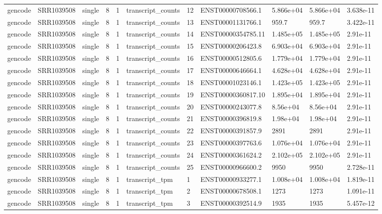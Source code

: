\begin{tabular}{lllllllllll}
gencode & SRR1039508 & single & 8 & 1 & transcript\_counts & 12 & ENST00000708566.1 & 5.866e+04 & 5.866e+04 & 3.638e-11 \\
gencode & SRR1039508 & single & 8 & 1 & transcript\_counts & 13 & ENST00001131766.1 & 959.7 & 959.7 & 3.422e-11 \\
gencode & SRR1039508 & single & 8 & 1 & transcript\_counts & 14 & ENST00000354785.11 & 1.485e+05 & 1.485e+05 & 2.91e-11 \\
gencode & SRR1039508 & single & 8 & 1 & transcript\_counts & 15 & ENST00000206423.8 & 6.903e+04 & 6.903e+04 & 2.91e-11 \\
gencode & SRR1039508 & single & 8 & 1 & transcript\_counts & 16 & ENST00000512805.6 & 1.779e+04 & 1.779e+04 & 2.91e-11 \\
gencode & SRR1039508 & single & 8 & 1 & transcript\_counts & 17 & ENST00000646664.1 & 4.628e+04 & 4.628e+04 & 2.91e-11 \\
gencode & SRR1039508 & single & 8 & 1 & transcript\_counts & 18 & ENST00001023146.1 & 1.423e+05 & 1.423e+05 & 2.91e-11 \\
gencode & SRR1039508 & single & 8 & 1 & transcript\_counts & 19 & ENST00000360817.10 & 1.895e+04 & 1.895e+04 & 2.91e-11 \\
gencode & SRR1039508 & single & 8 & 1 & transcript\_counts & 20 & ENST00000243077.8 & 8.56e+04 & 8.56e+04 & 2.91e-11 \\
gencode & SRR1039508 & single & 8 & 1 & transcript\_counts & 21 & ENST00000396819.8 & 1.98e+04 & 1.98e+04 & 2.91e-11 \\
gencode & SRR1039508 & single & 8 & 1 & transcript\_counts & 22 & ENST00000391857.9 & 2891 & 2891 & 2.91e-11 \\
gencode & SRR1039508 & single & 8 & 1 & transcript\_counts & 23 & ENST00000397763.6 & 1.076e+04 & 1.076e+04 & 2.91e-11 \\
gencode & SRR1039508 & single & 8 & 1 & transcript\_counts & 24 & ENST00000361624.2 & 2.102e+05 & 2.102e+05 & 2.91e-11 \\
gencode & SRR1039508 & single & 8 & 1 & transcript\_counts & 25 & ENST00000966600.2 & 9950 & 9950 & 2.728e-11 \\
gencode & SRR1039508 & single & 8 & 1 & transcript\_tpm & 1 & ENST00000933277.1 & 1.008e+04 & 1.008e+04 & 1.819e-11 \\
gencode & SRR1039508 & single & 8 & 1 & transcript\_tpm & 2 & ENST00000678508.1 & 1273 & 1273 & 1.091e-11 \\
gencode & SRR1039508 & single & 8 & 1 & transcript\_tpm & 3 & ENST00000392514.9 & 1935 & 1935 & 5.457e-12 \\

\end{tabular}

